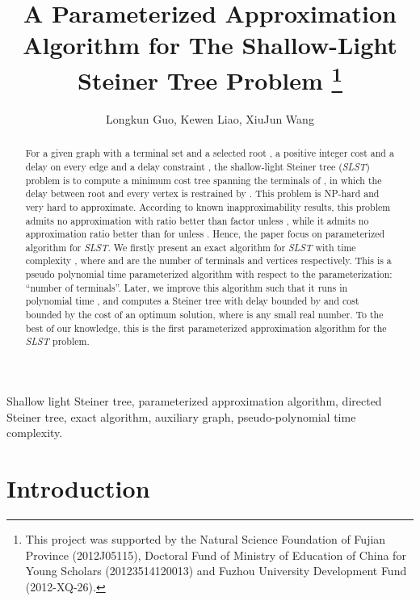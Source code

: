 \documentclass[english,runningheads,a4paper]{llncs}
\begin{document}
\title{A Parameterized Approximation Algorithm for The Shallow-Light Steiner
Tree Problem
\thanks{This project was supported by the Natural Science
Foundation of Fujian Province (2012J05115), Doctoral Fund of Ministry
of Education of China for Young Scholars (20123514120013) and Fuzhou
University Development Fund (2012-XQ-26). }
}
\author{{Longkun Guo, Kewen Liao}, XiuJun Wang}

\maketitle
\begin{abstract}
For a given graph  with a terminal set  and a selected
root , a positive integer cost and a delay on every edge
and a delay constraint , the shallow-light Steiner tree
(\emph{SLST}) problem is to compute a minimum cost tree spanning the
terminals of , in which the delay between root and every vertex
is restrained by . This problem is NP-hard and very hard to approximate.
According to known inapproximability results, this problem admits
no approximation with ratio better than factor 
unless  \cite{khandekar2013some},
while it admits no approximation ratio better than 
for  unless  \cite{bar2001generalized}.
Hence, the paper focus on parameterized algorithm for \emph{SLST}.
We firstly present an exact algorithm for \emph{SLST} with time complexity
, where  and
 are the number of terminals and vertices respectively. This
is a pseudo polynomial time parameterized algorithm with respect to
the parameterization: ``number of terminals''. Later, we improve
this algorithm such that it runs in polynomial time 
, and computes a Steiner tree with delay bounded by 
and cost bounded by the cost of an optimum solution, where 
is any small real number. To the best of our knowledge, this is the
first parameterized approximation algorithm for the \emph{SLST} problem. \end{abstract}
\begin{keywords}
Shallow light Steiner tree, parameterized approximation algorithm,
directed Steiner tree, exact algorithm, auxiliary graph, pseudo-polynomial
time complexity.
\end{keywords}

\section{Introduction}
\end{document}
